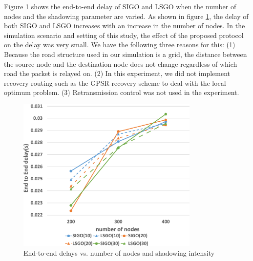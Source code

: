 \documentclass[conference]{IEEEtran}
\begin{document}
Figure \ref{fig:delay} shows the end-to-end delay of SIGO and LSGO when the number of nodes and the shadowing parameter are varied. 
As shown in figure \ref{fig:delay}, the delay of both SIGO and LSGO increases with an increase in the number of nodes. In the simulation scenario and setting of this study, the effect of the proposed protocol on the delay was very small. 
We have the following three reasons for this: 
(1) Because the road structure used in our simulation is a grid, the distance between the source node and the destination node does not change regardless of which road the packet is relayed on.
(2) In this experiment, we did not implement recovery routing such as the GPSR recovery scheme to deal with the local optimum problem. (3) Retransmission control was not used in the experiment.







\begin{figure}[!ht]
\centering
\includegraphics[width=90mm]{figures/delay.eps}
\caption{End-to-end delays vs. number of nodes and shadowing intensity }
\label{fig:delay}
\end{figure}
\end{document}
